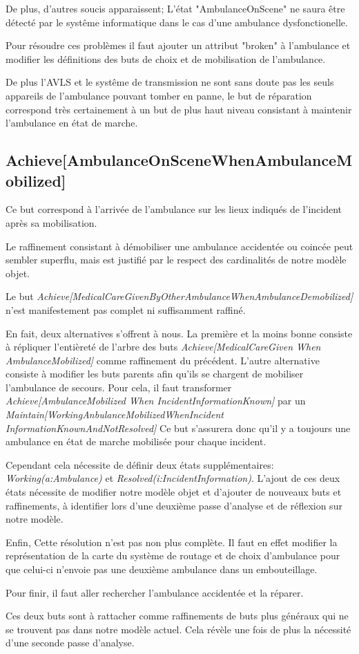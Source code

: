 	De plus, d'autres soucis apparaissent; L'état "AmbulanceOnScene"
	ne saura être détecté par le systême informatique dans le
	cas d'une ambulance dysfonctionelle.

	Pour résoudre ces problèmes il faut ajouter un attribut "broken"
	à l'ambulance et modifier les définitions des buts de choix et
	de mobilisation de l'ambulance. 

	De plus l'AVLS et le systême de transmission ne sont sans doute pas
	les seuls appareils de l'ambulance pouvant tomber en panne, le but
	de réparation correspond très certainement à un but de
	plus haut niveau consistant à maintenir l'ambulance en état de marche.

\subsection{Achieve[AmbulanceOnScene\-When\-AmbulanceMobilized]}
	Ce but correspond à l'arrivée de l'ambulance sur les lieux indiqués
	de l'incident après sa mobilisation.
	
	Le raffinement consistant à démobiliser une ambulance accidentée ou
	coincée peut sembler superflu, mais est justifié par le respect des
	cardinalités de notre modèle objet. 

	Le but \emph{Achieve[Medical\-Care\-Given\-By\-Other\-Ambulance\-When\-Ambulance\-Demobilized]}
	n'est manifestement pas complet ni suffisamment raffiné.
	
	En fait, deux alternatives s'offrent à nous. La première et la moins bonne
	consiste à répliquer l'entièreté de l'arbre des buts 
	\emph{Achieve[MedicalCareGiven When AmbulanceMobilized]}
	comme raffinement du précédent. L'autre alternative consi\-ste à modifier
	les buts parents afin qu'ils se chargent de mobiliser l'ambulance de 
	secours. Pour cela, il faut transformer 
	\emph{Achieve[AmbulanceMobilized When IncidentInformationKnown]}
	par un \emph{Maintain[Working\-Anbulance\-Mobilized\-When\-Incident InformationKnownAndNotResolved]}
	Ce but s'assurera donc qu'il y a toujours une ambulance en état de marche 
	mobilisée pour chaque incident. 
	
	Cependant cela nécessite de définir deux états supplé\-mentaires:  
	\emph{Working(a:Ambulance)} et \emph{Resolved(i:IncidentInformation)}. 
	L'ajout de ces deux états nécessite de modifier notre modèle objet 
	et d'ajouter de nouveaux buts et raffinements, à identifier lors d'une 
	deuxième passe d'analyse et de réflexion sur notre modèle.

	Enfin, Cette résolution n'est pas non plus complète. Il faut en effet
	modifier la représentation de la carte du système de routage et de choix
	d'ambulance pour que celui-ci n'envoie pas une deuxième ambulance dans
	un embouteillage. 

	Pour finir, il faut aller rechercher l'ambulance accidentée et la 
	réparer. 

	Ces deux buts sont à rattacher comme raffinements de buts plus généraux
	qui ne se trouvent pas dans notre modèle actuel. Cela révèle une fois de
	plus la nécessité d'une seconde passe d'analyse.

